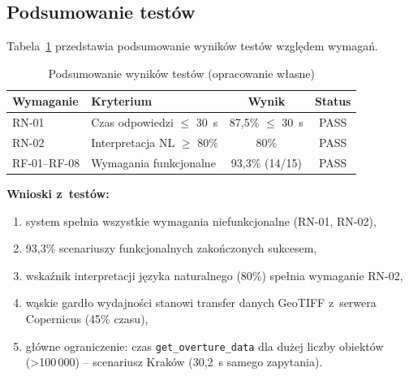 \subsection{Podsumowanie testów}

Tabela~\ref{tab:test_summary} przedstawia podsumowanie wyników testów względem wymagań.

\begin{table}[H]
    \centering
    \caption{Podsumowanie wyników testów (opracowanie własne)}
    \begin{tabular}{|l|l|c|c|}
        \hline
        \textbf{Wymaganie} & \textbf{Kryterium} & \textbf{Wynik} & \textbf{Status} \\
        \hline
        RN-01 & Czas odpowiedzi $\leq$ 30~s & 87,5\% $\leq$ 30~s & PASS \\
        \hline
        RN-02 & Interpretacja NL $\geq$ 80\% & 80\% & PASS \\
        \hline
        RF-01--RF-08 & Wymagania funkcjonalne & 93,3\% (14/15) & PASS \\
        \hline
    \end{tabular}
    \label{tab:test_summary}
\end{table}

\textbf{Wnioski z~testów:}
\begin{enumerate}
    \item system spełnia wszystkie wymagania niefunkcjonalne (RN-01, RN-02),
    \item 93,3\% scenariuszy funkcjonalnych zakończonych sukcesem,
    \item wskaźnik interpretacji języka naturalnego (80\%) spełnia wymaganie RN-02,
    \item wąskie gardło wydajności stanowi transfer danych GeoTIFF z~serwera Copernicus (45\% czasu),
    \item główne ograniczenie: czas \texttt{get\_overture\_data} dla dużej liczby obiektów (>100\,000) -- scenariusz Kraków (30,2~s samego zapytania).
\end{enumerate}

